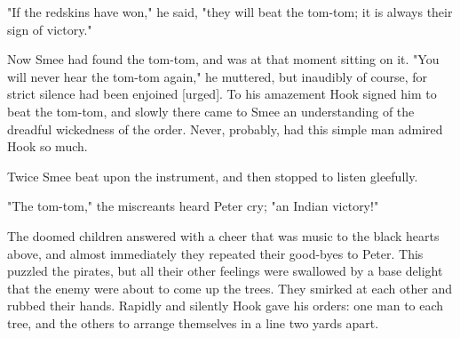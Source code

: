 "If the redskins have won," he said, "they will beat the tom-tom; it is
always their sign of victory."


Now Smee had found the tom-tom, and was at that moment sitting on it. "You
will never hear the tom-tom again," he muttered, but inaudibly of course,
for strict silence had been enjoined [urged]. To his amazement Hook signed
him to beat the tom-tom, and slowly there came to Smee an understanding of
the dreadful wickedness of the order. Never, probably, had this simple man
admired Hook so much.


Twice Smee beat upon the instrument, and then stopped to listen gleefully.


"The tom-tom," the miscreants heard Peter cry; "an Indian victory!"


The doomed children answered with a cheer that was music to the black
hearts above, and almost immediately they repeated their good-byes to
Peter. This puzzled the pirates, but all their other feelings were
swallowed by a base delight that the enemy were about to come up the
trees. They smirked at each other and rubbed their hands. Rapidly and
silently Hook gave his orders: one man to each tree, and the others to
arrange themselves in a line two yards apart.

